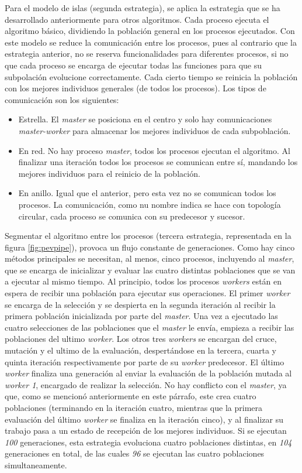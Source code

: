 	Para el modelo de islas (segunda estrategia), se aplica la estrategia que se ha desarrollado anteriormente para otros algoritmos. Cada proceso ejecuta el algoritmo básico, dividiendo la población general en los procesos ejecutados. Con este modelo se reduce la comunicación entre los procesos, pues al contrario que la estrategia anterior, no se reserva funcionalidades para diferentes procesos, si no que cada proceso se encarga de ejecutar todas las funciones para que su subpolación evolucione correctamente. Cada cierto tiempo se reinicia la población con los mejores individuos generales (de todos los procesos). Los tipos de comunicación son los siguientes: 

	\begin{itemize}
		\item Estrella. El \textit{master} se posiciona en el centro y solo hay comunicaciones \textit{master-worker} para almacenar los mejores individuos de cada subpoblación.
		\item En red. No hay proceso \textit{master}, todos los procesos ejecutan el algoritmo. Al finalizar una iteración todos los procesos se comunican entre sí, mandando los mejores individuos para el reinicio de la población.
		\item En anillo. Igual que el anterior, pero esta vez no se comunican todos los procesos. La comunicación, como nu nombre indica se hace con topología circular, cada proceso se comunica con su predecesor y sucesor.
	\end{itemize}
	
	Segmentar el algoritmo entre los procesos (tercera estrategia, representada en la figura \ref{fig:pevpipe}), provoca un flujo constante de generaciones. Como hay cinco métodos principales se necesitan, al menos, cinco procesos, incluyendo al \textit{master}, que se encarga de inicializar y evaluar las cuatro distintas poblaciones que se van a ejecutar al mismo tiempo. Al principio, todos los procesos \textit{workers} están en espera de recibir una población para ejecutar sus operaciones. El primer \textit{worker} se encarga de la selección y se despierta en la segunda iteración al recibir la primera población inicializada por parte del \textit{master}. Una vez a ejecutado las cuatro selecciones de las poblaciones que el \textit{master} le envía, empieza a recibir las poblaciones del ultimo \textit{worker}. Los otros tres \textit{workers} se encargan del cruce, mutación y el ultimo de la evaluación, despertándose en la tercera, cuarta y quinta iteración respectivamente por parte de su \textit{worker} predecesor. El último \textit{worker} finaliza una generación al enviar la evaluación de la población mutada al \textit{worker 1}, encargado de realizar la selección. No hay conflicto con el \textit{master}, ya que, como se mencionó anteriormente en este párrafo, este crea cuatro poblaciones (terminando en la iteración cuatro, mientras que la primera evaluación del último \textit{worker} se finaliza en la iteración cinco), y al finalizar su trabajo pasa a un estado de recepción de los mejores individuos. Si se ejecutan \textit{100} generaciones, esta estrategia evoluciona cuatro poblaciones distintas, en \textit{104} generaciones en total, de las cuales \textit{96} se ejecutan las cuatro poblaciones simultaneamente.
	
